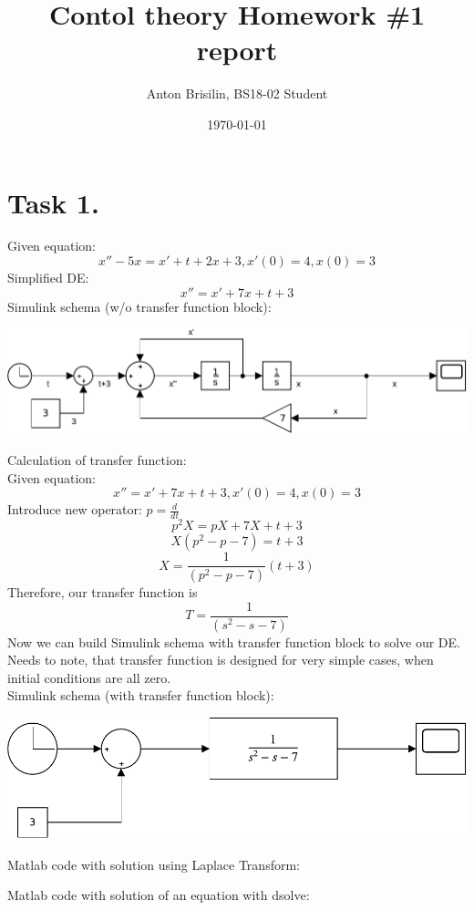 \documentclass[a4paper,12pt]{article}
\title{Contol theory Homework \#1 report}
\author{Anton Brisilin, BS18-02 Student}
\date{\today}
\begin{document}
\maketitle
\section{Task 1.}
Given equation:
$$x''-5x=x'+t+2x+3, x'(0)=4, x(0)=3$$
Simplified DE:
$$x''=x'+7x+t+3$$
Simulink schema (w/o transfer function block):
\begin{center}
    \includegraphics[width=\linewidth]{Schema1.pdf}
\end{center}
Calculation of transfer function:\\
Given equation:
$$x''=x'+7x+t+3, x'(0)=4, x(0)=3$$
Introduce new operator: $p=\frac{d}{dt}$
$$p^2X = pX+7X+t+3$$
$$X(p^2-p-7)=t+3$$
$$X=\frac{1}{(p^2-p-7)}(t+3)$$
Therefore, our transfer function is 
$$T=\frac{1}{(s^2-s-7)}$$
Now we can build Simulink schema with transfer function 
block to solve our DE. Needs to note, that transfer 
function is designed for very simple cases, when initial 
conditions are all zero.\\
Simulink schema (with transfer function block):
\begin{center}
    \includegraphics[width=\linewidth]{Schema2.pdf}
\end{center}
Matlab code with solution using Laplace Transform:

Matlab code with solution of an equation with dsolve:

\end{document}
